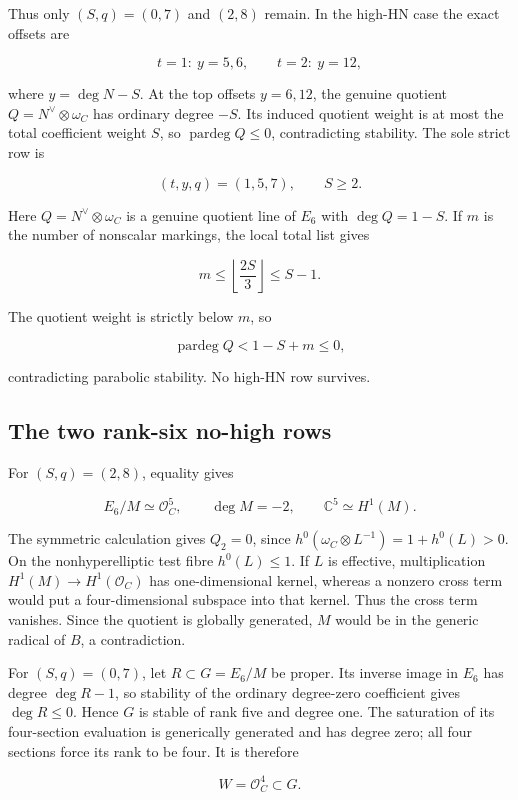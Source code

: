 \documentclass[11pt]{article}
\theoremstyle{definition}
\begin{document}
Thus only \((S,q)=(0,7)\) and \((2,8)\) remain. In the high-HN case the
exact offsets are

\[t=1:\ y=5,6,
\qquad
t=2:\ y=12,\]

where \(y=\deg N-S\). At the top offsets \(y=6,12\), the genuine
quotient \(Q=N^\vee\otimes\omega_C\) has ordinary degree \(-S\). Its
induced quotient weight is at most the total coefficient weight \(S\),
so \(\operatorname{pardeg}Q\le0\), contradicting stability. The sole
strict row is

\[(t,y,q)=(1,5,7),\qquad S\ge2.\]

Here \(Q=N^\vee\otimes\omega_C\) is a genuine quotient line of \(E_6\)
with \(\deg Q=1-S\). If \(m\) is the number of nonscalar markings, the
local total list gives

\[m\le\left\lfloor\frac{2S}{3}\right\rfloor\le S-1.\]

The quotient weight is strictly below \(m\), so

\[\operatorname{pardeg}Q<1-S+m\le0,\]

contradicting parabolic stability. No high-HN row survives.

\subsection{The two rank-six no-high
rows}\label{the-two-rank-six-no-high-rows}

For \((S,q)=(2,8)\), equality gives

\[E_6/M\simeq\mathcal O_C^5,
\qquad \deg M=-2,
\qquad \mathbb C^5\simeq H^1(M).\]

The symmetric calculation gives \(Q_2=0\), since
\(h^0(\omega_C\otimes L^{-1})=1+h^0(L)>0\). On the nonhyperelliptic test
fibre \(h^0(L)\le1\). If \(L\) is effective, multiplication
\(H^1(M)\to H^1(\mathcal O_C)\) has one-dimensional kernel, whereas a
nonzero cross term would put a four-dimensional subspace into that
kernel. Thus the cross term vanishes. Since the quotient is globally
generated, \(M\) would be in the generic radical of \(B\), a
contradiction.

For \((S,q)=(0,7)\), let \(R\subset G=E_6/M\) be proper. Its inverse
image in \(E_6\) has degree \(\deg R-1\), so stability of the ordinary
degree-zero coefficient gives \(\deg R\le0\). Hence \(G\) is stable of
rank five and degree one. The saturation of its four-section evaluation
is generically generated and has degree zero; all four sections force
its rank to be four. It is therefore

\[W=\mathcal O_C^4\subset G.\]
\end{document}

